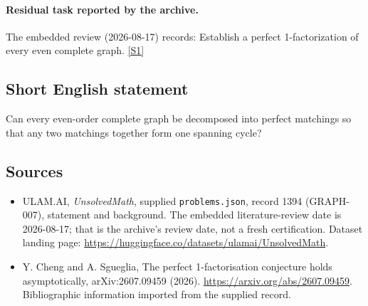 \documentclass[11pt,a4paper]{article}
\newcommand{\sref}[2]{\hyperlink{source:#1:#2}{[S#2]}}
\begin{document}
\paragraph{Residual task reported by the archive.}

The embedded review (2026-08-17) records: Establish a perfect 1-factorization of every even complete graph. \sref{1394}{1}

\subsection{Short English statement}

Can every even-order complete graph be decomposed into perfect matchings so that any two matchings together form one spanning cycle?

\subsection{Sources}

{\small

\begin{itemize}

\item[\hypertarget{source:1394:1}{S1}] ULAM.AI, \emph{UnsolvedMath}, supplied \texttt{problems.json}, record 1394 (GRAPH-007), statement and background. The embedded literature-review date is 2026-08-17; that is the archive’s review date, not a fresh certification. Dataset landing page: \url{https://huggingface.co/datasets/ulamai/UnsolvedMath}.

\item[\hypertarget{source:1394:2}{S2}] Y. Cheng and A. Sgueglia, The perfect 1-factorisation conjecture holds asymptotically, arXiv:2607.09459 (2026). \url{https://arxiv.org/abs/2607.09459}. Bibliographic information imported from the supplied record.

\end{itemize}

}

\label{end:1394}
\end{document}
